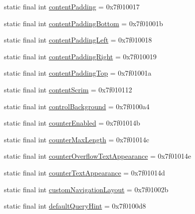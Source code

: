 \begin{CompactItemize}
\item 
static final int \hyperlink{classandroid_1_1support_1_1graphics_1_1drawable_1_1_r_1_1attr_02dd97a3605697be42776c213a29b21c}{contentPadding} = 0x7f010017
\item 
static final int \hyperlink{classandroid_1_1support_1_1graphics_1_1drawable_1_1_r_1_1attr_9aa5cf1f49b3c01b6a8aed1a92b4e771}{contentPaddingBottom} = 0x7f01001b
\item 
static final int \hyperlink{classandroid_1_1support_1_1graphics_1_1drawable_1_1_r_1_1attr_c332f2614660071cb5264a61a6738c27}{contentPaddingLeft} = 0x7f010018
\item 
static final int \hyperlink{classandroid_1_1support_1_1graphics_1_1drawable_1_1_r_1_1attr_1090ed7a3f302b698f79ffd356bf1aa6}{contentPaddingRight} = 0x7f010019
\item 
static final int \hyperlink{classandroid_1_1support_1_1graphics_1_1drawable_1_1_r_1_1attr_46879428b18a86e50cf865d6b5203a93}{contentPaddingTop} = 0x7f01001a
\item 
static final int \hyperlink{classandroid_1_1support_1_1graphics_1_1drawable_1_1_r_1_1attr_9e189d4e34496664687be9cf0672720f}{contentScrim} = 0x7f010112
\item 
static final int \hyperlink{classandroid_1_1support_1_1graphics_1_1drawable_1_1_r_1_1attr_b825e05e961f0b282d26ca6623d1f1a1}{controlBackground} = 0x7f0100a4
\item 
static final int \hyperlink{classandroid_1_1support_1_1graphics_1_1drawable_1_1_r_1_1attr_56e986da4e516ba90edc31787b70460c}{counterEnabled} = 0x7f01014b
\item 
static final int \hyperlink{classandroid_1_1support_1_1graphics_1_1drawable_1_1_r_1_1attr_0f9c0e0f6f51d857295aa8e272d8d8f3}{counterMaxLength} = 0x7f01014c
\item 
static final int \hyperlink{classandroid_1_1support_1_1graphics_1_1drawable_1_1_r_1_1attr_a976ba54a8876e6cf2b496978f975545}{counterOverflowTextAppearance} = 0x7f01014e
\item 
static final int \hyperlink{classandroid_1_1support_1_1graphics_1_1drawable_1_1_r_1_1attr_b9d0fc649a447331efba7b2f2780897b}{counterTextAppearance} = 0x7f01014d
\item 
static final int \hyperlink{classandroid_1_1support_1_1graphics_1_1drawable_1_1_r_1_1attr_ed0fc2c89f4f357e9f1b212ecb59870d}{customNavigationLayout} = 0x7f01002b
\item 
static final int \hyperlink{classandroid_1_1support_1_1graphics_1_1drawable_1_1_r_1_1attr_1547dbc481fa384a5f80d2d2652d5d29}{defaultQueryHint} = 0x7f0100d8

\end{CompactItemize}
